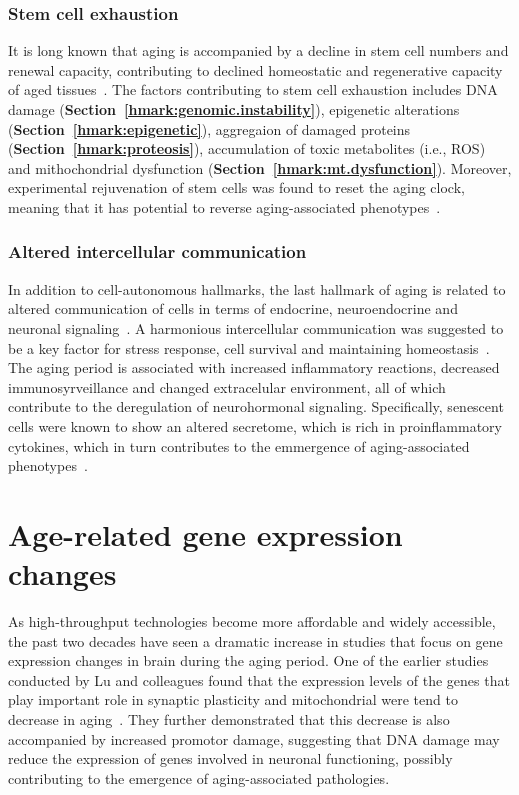 \subsubsection{Stem cell exhaustion}
It is long known that aging is accompanied by a decline in stem cell numbers and renewal capacity, 
contributing to declined homeostatic and regenerative capacity of aged tissues~\cite{Oh2014}.
The factors contributing to stem cell exhaustion includes
DNA damage (\textbf{Section~\ref{hmark:genomic.instability}}), 
epigenetic alterations (\textbf{Section~\ref{hmark:epigenetic}}), 
aggregaion of damaged proteins (\textbf{Section~\ref{hmark:proteosis}}),
accumulation of toxic metabolites (i.e., ROS) and
mithochondrial dysfunction (\textbf{Section~\ref{hmark:mt.dysfunction}}).
Moreover, experimental rejuvenation of stem cells was found to reset the aging clock, 
meaning that it has potential to reverse aging-associated phenotypes~\cite{Rando2012}.

\subsubsection{Altered intercellular communication}
In addition to cell-autonomous hallmarks, the last hallmark of aging is related to altered communication of cells 
in terms of endocrine, neuroendocrine and neuronal signaling~\cite{Russell2007}.
A harmonious intercellular communication was suggested to be a key factor for stress response, cell survival and maintaining homeostasis~\cite{Tan2021}.
The aging period is associated with increased inflammatory reactions, decreased immunosyrveillance and changed extracelular environment,
all of which contribute to the deregulation of neurohormonal signaling.
Specifically, senescent cells were known to show an altered secretome, which is rich in proinflammatory cytokines, 
which in turn contributes to the emmergence of aging-associated phenotypes~\cite{Childs2016, Kuilman2010}.

\section{Age-related gene expression changes}
As high-throughput technologies become more affordable and widely accessible, 
the past two decades have seen a dramatic increase in studies that focus on gene expression changes in brain during the aging period.
One of the earlier studies conducted by Lu and colleagues found that the expression levels of the genes 
that play important role in synaptic plasticity and mitochondrial were tend to decrease in aging~\cite{Lu2004}. 
They further demonstrated that this decrease is also accompanied by increased promotor damage, 
suggesting that DNA damage may reduce the expression of genes involved in neuronal functioning, 
possibly contributing to the emergence of aging-associated pathologies.

